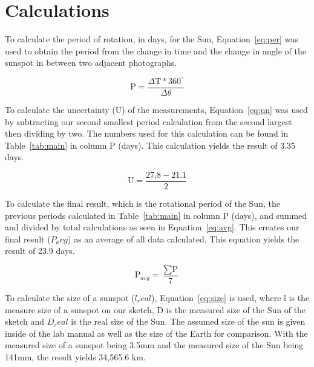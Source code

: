 \documentclass{article}
\begin{document}

\section{Calculations}

To calculate the period of rotation, in days, for the Sun, Equation~\ref{eq:per} was used to obtain the period from
the change in time and the change in angle of the sunspot in between two adjacent photographs.

\begin{equation}
\label{eq:per}
\text{P} = \frac{\Delta\text{T} * 360^\circ}{\Delta\theta}
\end{equation}

To calculate the uncertainty (U) of the measurements, Equation~\ref{eq:un} was used by subtracting our second 
smallest period calculation from the second largest then dividing by two. The numbers used for this calculation
can be found in Table~\ref{tab:main} in column P (days). This calculation yields the result of 3.35 days.

\begin{equation}
\label{eq:un}
\text{U} = \frac{27.8 - 21.1}{2}
\end{equation}

To calculate the final result, which is the rotational period of the Sun, the previous periods calculated in 
Table~\ref{tab:main} in column P (days), and summed and divided by total calculations as seen in
Equation~\ref{eq:avg}. This creates our final result ($P_avg$) as an average of all data calculated. This
equation yields the result of 23.9 days.

\begin{equation}
\label{eq:avg}
\text{P}_{avg} = \frac{\sum\text{P}}{7}
\end{equation}

To calculate the size of a sunspot ($l_real$), Equation~\ref{eq:size} is used, where l is the measure size of
a sunspot on our sketch, D is the measured size of the Sun of the sketch and $D_real$ is the real size of
the Sun. The assumed size of the sun is given inside of the lab manual as well as the size of the Earth for comparison.
With the measured size of a sunspot being 3.5mm and the measured size of the Sun being 141mm, the 
result yields 34,565.6 km.
\end{document}
